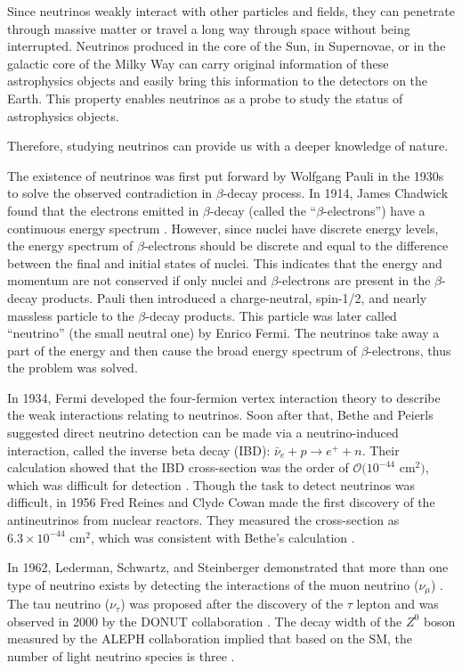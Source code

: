 Since neutrinos weakly interact with other particles and fields, they can penetrate through massive matter or travel a long way through space without being interrupted. Neutrinos produced in the core of the Sun, in Supernovae, or in the galactic core of the Milky Way can carry original information of these astrophysics objects and easily bring this information to the detectors on the Earth. This property enables neutrinos as a probe to study the status of astrophysics objects.

Therefore, studying neutrinos can provide us with a deeper knowledge of nature.

The existence of neutrinos was first put forward by Wolfgang Pauli in the 1930s to solve the observed contradiction in $\beta$-decay process. In 1914, James Chadwick found that the electrons emitted in $\beta$-decay (called the ``$\beta$-electrons'') have a continuous energy spectrum \cite{leite1996weak}. However, since nuclei have discrete energy levels, the energy spectrum of $\beta$-electrons should be discrete and equal to the difference between the final and initial states of nuclei. This indicates that the energy and momentum are not conserved if only nuclei and $\beta$-electrons are present in the $\beta$-decay products. Pauli then introduced a charge-neutral, spin-1/2, and nearly massless particle to the $\beta$-decay products. This particle was later called ``neutrino'' (the small neutral one) by Enrico Fermi. The neutrinos take away a part of the energy and then cause the broad energy spectrum of $\beta$-electrons, thus the problem was solved.

In 1934, Fermi developed the four-fermion vertex interaction theory to describe the weak interactions relating to neutrinos. Soon after that, Bethe and Peierls suggested direct neutrino detection can be made via a neutrino-induced interaction, called the inverse beta decay (IBD): $\bar{\nu}_e+p\to e^+ + n$. Their calculation showed that the IBD cross-section was the order of $\mathcal{O}(10^{-44}$ cm$^2)$, which was difficult for detection \cite{bethe1934neutrino}. Though the task to detect neutrinos was difficult, in 1956 Fred Reines and Clyde Cowan made the first discovery of the antineutrinos from nuclear reactors. They measured the cross-section as $6.3\times10^{-44}$ cm$^2$, which was consistent with Bethe's calculation \cite{reines1960detection}.

In 1962, Lederman, Schwartz, and Steinberger demonstrated that more than one type of neutrino exists by detecting the interactions of the muon neutrino ($\nu_\mu$) \cite{danby1962observation}. The tau neutrino ($\nu_\tau$) was proposed after the discovery of the $\tau$ lepton and was observed in 2000 by the DONUT collaboration \cite{kodama2001observation}. The decay width of the $Z^0$ boson measured by the ALEPH collaboration implied that based on the SM, the number of light neutrino species is three \cite{decamp1989determination}.

